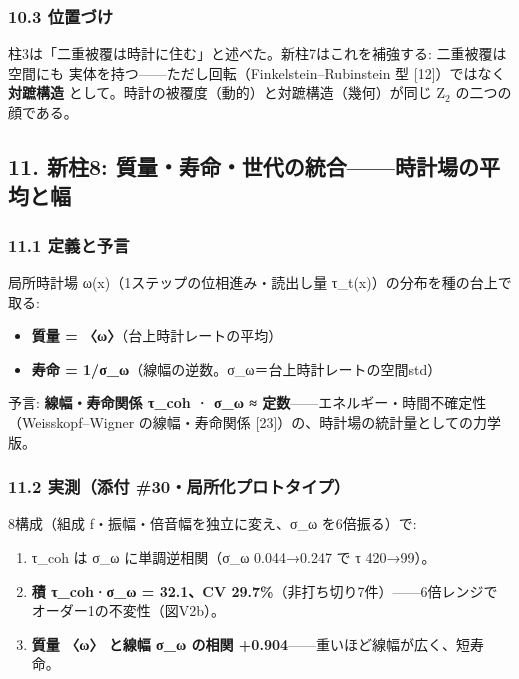 \documentclass[
]{ltjarticle}
\providecommand{\tightlist}{%
  \setlength{\itemsep}{0pt}\setlength{\parskip}{0pt}}
\begin{document}
\subsubsection{10.3 位置づけ}\label{ux4f4dux7f6eux3065ux3051}

柱3は「二重被覆は時計に住む」と述べた。新柱7はこれを補強する:
二重被覆は空間にも 実体を持つ------ただし回転（Finkelstein--Rubinstein
型 {[}12{]}）ではなく\textbf{対蹠構造}
として。時計の被覆度（動的）と対蹠構造（幾何）が同じ Z\(_{2}\)
の二つの顔である。

\subsection{11. 新柱8:
質量・寿命・世代の統合------時計場の平均と幅}\label{ux65b0ux67f18-ux8ceaux91cfux5bffux547dux4e16ux4ee3ux306eux7d71ux5408ux6642ux8a08ux5834ux306eux5e73ux5747ux3068ux5e45}

\subsubsection{11.1 定義と予言}\label{ux5b9aux7fa9ux3068ux4e88ux8a00}

局所時計場 ω(x)（1ステップの位相進み・読出し量
τ\_t(x)）の分布を種の台上で取る:

\begin{itemize}
\tightlist
\item
  \textbf{質量 = 〈ω〉}（台上時計レートの平均）
\item
  \textbf{寿命 = 1/σ\_ω}（線幅の逆数。σ\_ω＝台上時計レートの空間std）
\end{itemize}

予言: \textbf{線幅・寿命関係 τ\_coh · σ\_ω ≈
定数}------エネルギー・時間不確定性 （Weisskopf--Wigner の線幅・寿命関係
{[}23{]}）の、時計場の統計量としての力学版。

\subsubsection{11.2 実測（添付
\#30・局所化プロトタイプ）}\label{ux5b9fux6e2cux6dfbux4ed8-30ux5c40ux6240ux5316ux30d7ux30edux30c8ux30bfux30a4ux30d7}

8構成（組成 f・振幅・倍音幅を独立に変え、σ\_ω を6倍振る）で:

\begin{enumerate}
\def\labelenumi{\arabic{enumi}.}
\tightlist
\item
  τ\_coh は σ\_ω に単調逆相関（σ\_ω 0.044→0.247 で τ 420→99）。
\item
  \textbf{積 τ\_coh·σ\_ω = 32.1、CV
  29.7\%}（非打ち切り7件）------6倍レンジで オーダー1の不変性（図V2b）。
\item
  \textbf{質量 〈ω〉 と線幅 σ\_ω の相関
  +0.904}------重いほど線幅が広く、短寿命。
\end{enumerate}
\end{document}
